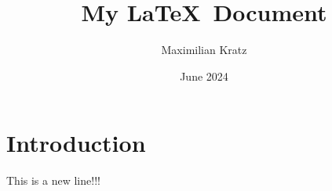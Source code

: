 \documentclass{article}
\title{My \LaTeX~Document}
\author{Maximilian Kratz}
\date{June 2024}
\begin{document}
\maketitle

\section{Introduction}
This is a new line!!!
\end{document}

